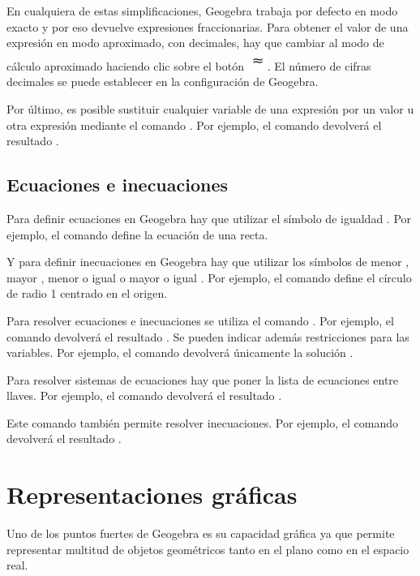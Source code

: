 En cualquiera de estas simplificaciones, Geogebra trabaja por defecto en modo exacto y por eso devuelve expresiones fraccionarias.
Para obtener el valor de una expresión en modo aproximado, con decimales, hay que cambiar al modo de cálculo aproximado haciendo clic sobre el botón \includegraphics[scale=0.03]{img/introduccion/approximate-button}.
El número de cifras decimales se puede establecer en la configuración de Geogebra.

Por último, es posible sustituir cualquier variable de una expresión por un valor u otra expresión mediante el comando .
Por ejemplo, el comando  devolverá el resultado .

\subsection*{Ecuaciones e inecuaciones}
Para definir ecuaciones en Geogebra hay que utilizar el símbolo de igualdad \command{=}.
Por ejemplo, el comando  define la ecuación de una recta.

Y para definir inecuaciones en Geogebra hay que utilizar los símbolos de menor \command{<}, mayor \command{>}, menor o igual \command{<=} o mayor o igual \command{>=}.
Por ejemplo, el comando  define el círculo de radio 1 centrado en el origen.

Para resolver ecuaciones e inecuaciones se utiliza el comando .
Por ejemplo, el comando  devolverá el resultado .
Se pueden indicar además restricciones para las variables.
Por ejemplo, el comando  devolverá únicamente la solución .

Para resolver sistemas de ecuaciones hay que poner la lista de ecuaciones entre llaves.
Por ejemplo, el comando  devolverá el resultado .

Este comando también permite resolver inecuaciones.
Por ejemplo, el comando  devolverá el resultado .


\section{Representaciones gráficas}
Uno de los puntos fuertes de Geogebra es su capacidad gráfica ya que permite representar multitud de objetos geométricos tanto en el plano como en el espacio real.

